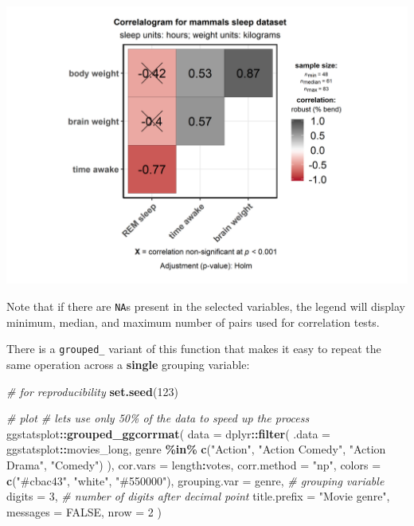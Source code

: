 \documentclass[
]{article}
\newenvironment{Shaded}{\begin{snugshade}}{\end{snugshade}}
\newcommand{\CommentTok}[1]{\textcolor[rgb]{0.56,0.35,0.01}{\textit{#1}}}
\newcommand{\DataTypeTok}[1]{\textcolor[rgb]{0.13,0.29,0.53}{#1}}
\newcommand{\DecValTok}[1]{\textcolor[rgb]{0.00,0.00,0.81}{#1}}
\newcommand{\KeywordTok}[1]{\textcolor[rgb]{0.13,0.29,0.53}{\textbf{#1}}}
\newcommand{\NormalTok}[1]{#1}
\newcommand{\OperatorTok}[1]{\textcolor[rgb]{0.81,0.36,0.00}{\textbf{#1}}}
\newcommand{\OtherTok}[1]{\textcolor[rgb]{0.56,0.35,0.01}{#1}}
\newcommand{\StringTok}[1]{\textcolor[rgb]{0.31,0.60,0.02}{#1}}
\begin{document}
\includegraphics[width=1\linewidth]{./figures/paper-ggcorrmat1-1}

Note that if there are \texttt{NA}s present in the selected variables, the legend will
display minimum, median, and maximum number of pairs used for correlation tests.

There is a \texttt{grouped\_} variant of this function that makes it
easy to repeat the same operation across a \textbf{single} grouping variable:

\begin{Shaded}
\begin{Highlighting}[]
\CommentTok{\# for reproducibility}
\KeywordTok{set.seed}\NormalTok{(}\DecValTok{123}\NormalTok{)}

\CommentTok{\# plot}
\CommentTok{\# let\textquotesingle{}s use only 50\% of the data to speed up the process}
\NormalTok{ggstatsplot}\OperatorTok{::}\KeywordTok{grouped\_ggcorrmat}\NormalTok{(}
  \DataTypeTok{data =}\NormalTok{ dplyr}\OperatorTok{::}\KeywordTok{filter}\NormalTok{(}
    \DataTypeTok{.data =}\NormalTok{ ggstatsplot}\OperatorTok{::}\NormalTok{movies\_long,}
\NormalTok{    genre }\OperatorTok{\%in\%}\StringTok{ }\KeywordTok{c}\NormalTok{(}\StringTok{"Action"}\NormalTok{, }\StringTok{"Action Comedy"}\NormalTok{, }\StringTok{"Action Drama"}\NormalTok{, }\StringTok{"Comedy"}\NormalTok{)}
\NormalTok{  ),}
  \DataTypeTok{cor.vars =}\NormalTok{ length}\OperatorTok{:}\NormalTok{votes,}
  \DataTypeTok{corr.method =} \StringTok{"np"}\NormalTok{,}
  \DataTypeTok{colors =} \KeywordTok{c}\NormalTok{(}\StringTok{"\#cbac43"}\NormalTok{, }\StringTok{"white"}\NormalTok{, }\StringTok{"\#550000"}\NormalTok{),}
  \DataTypeTok{grouping.var =}\NormalTok{ genre, }\CommentTok{\# grouping variable}
  \DataTypeTok{digits =} \DecValTok{3}\NormalTok{, }\CommentTok{\# number of digits after decimal point}
  \DataTypeTok{title.prefix =} \StringTok{"Movie genre"}\NormalTok{,}
  \DataTypeTok{messages =} \OtherTok{FALSE}\NormalTok{,}
  \DataTypeTok{nrow =} \DecValTok{2}
\NormalTok{)}
\end{Highlighting}
\end{Shaded}
\end{document}
